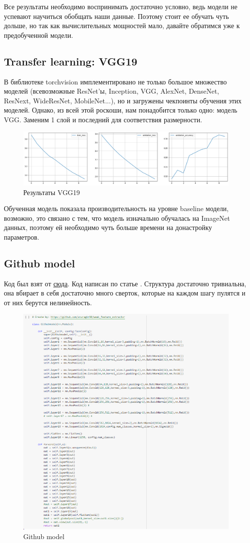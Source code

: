 \documentclass[a4paper,12pt]{article}
\begin{document}
 	Все результаты необходимо воспринимать достаточно условно, ведь модели не успевают научиться обобщать наши данные. Поэтому стоит ее обучать чуть дольше, но так как вычислительных мощностей мало, давайте обратимся уже к предобученной модели.
	 	
 	\subsection{Transfer learning: VGG19}
 	В библиотеке torchvision имплементировано не только большое множество моделей (всевозможные ResNet'ы, Inception, VGG, AlexNet, DenseNet, ResNext, WideResNet, MobileNet...), но и загружены чекпоинты обучения этих моделей. Однако, из всей этой роскоши, нам понадобится только одно: модель VGG. Заменим 1 слой и последний для соответствия размерности.
 		\begin{figure}[H]
 		\centering
 		\includegraphics[width=1\linewidth]{Image/Transfer_learning_results.png}
 		\caption{Результаты VGG19}
 		\label{fig:crnn}
 	\end{figure}
 	Обученная модель показала производительность на уровне baseline модели, возможно, это связано с тем, что модель изначально обучалась на ImageNet данных, поэтому ей необходимо чуть больше времени на донастройку параметров.
 	\subsection{Github model}
 	Код был взят от \href{https://github.com/anuragkr90/weak_feature_extractor}{сюда}. Код написан по статье \cite{5}. Структура достаточно тривиальна, она вбирает в себя достаточно много сверток, которые на каждом шагу пулятся и от них берутся нелинейность. 
 	\begin{figure}[H]
 		\centering
 		\includegraphics[width=0.7\linewidth]{Image/Github_model}
 		\caption{Github model}
 		\label{fig:githubmodel}
 	\end{figure}
 
\end{document}
